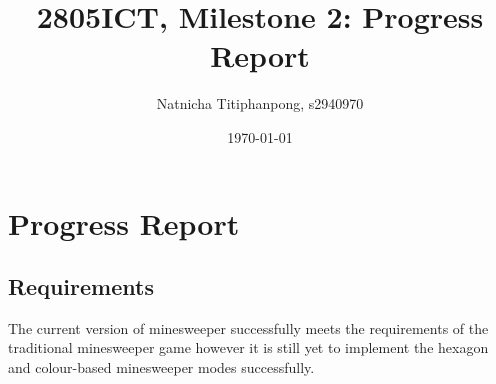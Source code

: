 \documentclass[12pt, a4]{report}
\title{2805ICT, Milestone 2: Progress Report}
\author{Natnicha Titiphanpong, s2940970}%
\date{\today}
\begin{document}
\begin{titlepage}
	\maketitle 
\end{titlepage}
	\tableofcontents
	\pagebreak
	\section{Progress Report} 
	\subsection{Requirements}
	\par The current  version of minesweeper successfully meets the requirements of the traditional minesweeper game however it is still yet to implement the hexagon and colour-based minesweeper  modes successfully. 
\end{document}
